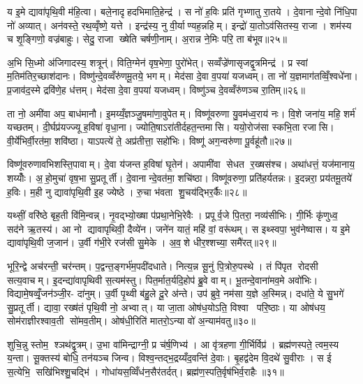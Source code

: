 य इ॒मे द्यावा॑पृथि॒वी म॑हि॒त्वा। बले॒नादृहदभिमाति॒हेन्द्र॑। स नो॑ ह॒विः प्रति॑ गृभ्णातु रा॒तये। दे॒वानान्दे॒वो नि॑धि॒पा नो॑ अव्यात्। अन॑वस्ते॒ रथ॒व्वृँष्णे॒ यत्ते। इन्द्र॑स्य॒ नु वी॒र्याण्यह॒न्नहिम्। इन्द्रो॑ या॒तोऽव॑सितस्य॒ राजा। शम॑स्य च शृ॒ङ्गिणो॒ वज्र॑बाहुः। सेदु॒ राजा ख्षेति चर्\mbox{}षणी॒नाम्। अ॒रान्न ने॒मिः परि॒ ता ब॑भूव॥२५॥

अ॒भि सि॒ध्मो अ॑जिगादस्य॒ शत्रून्॑। विति॒ग्मेन॑ वृष॒भेणा॒ पुरो॑भेत्। सव्वँज्रे॑णासृजद्वृ॒त्रमिन्द्र॑। प्र स्वां म॒तिम॑तिर॒च्छाश॑दानः। विष्णु॑न्दे॒वव्वँरु॑णमू॒तये॒ भगम्। मेद॑सा दे॒वा व॒पया॑ यजध्वम्। ता नो॑ य॒ज्ञमाग॑तव्विँ॒श्वधे॑ना। प्र॒जाव॑द॒स्मे द्रवि॑णे॒ह ध॑त्तम्। मेद॑सा दे॒वा व॒पया॑ यजध्वम्। विष्णु॑ञ्च दे॒वव्वँरु॑णञ्च रा॒तिम्॥२६॥

ता नो॒ अमी॑वा अप॒ बाध॑मानौ। इ॒मय्यँ॒ज्ञञ्जु॒षमा॑णा॒वुपेतम्। विष्णू॑वरुणा यु॒वम॑ध्व॒राय॑ नः। वि॒शे जना॑य॒ महि॒ शर्म॑ यच्छतम्। दी॒र्घप्र॑यज्ज्यू ह॒विषा॑ वृधा॒ना। ज्योति॒षाऽरा॑तीर्दहत॒न्तमासि। ययो॒रोज॑सा स्कभि॒ता रजासि। वी॒र्ये॑भिर्वी॒रत॑मा॒ शवि॑ष्ठा। याऽपत्ये॑ ते॒ अप्र॑तीत्ता॒ सहो॑भिः। विष्णू॑ अग॒न्वरु॑णा पू॒र्वहू॑तौ॥२७॥

विष्णू॑वरुणावभिशस्ति॒पावाम्। दे॒वा य॑जन्त ह॒विषा॑ घृ॒तेन॑। अपामी॑वा सेधत र॒ख्षस॑श्च। अथा॑धत्तं॒ यज॑मानाय॒ शय्योँः। अ॒हो॒मुचा॑ वृष॒भा सु॒प्रतूर्ती। दे॒वानान्दे॒वत॑मा॒ शचि॑ष्ठा। विष्णू॑वरुणा॒ प्रति॑हर्यतन्नः। इ॒दन्नरा॒ प्रय॑तमू॒तये॑ ह॒विः। म॒ही नु द्यावा॑पृथि॒वी इ॒ह ज्येष्ठे। रु॒चा भ॑वता शु॒चय॑द्भिर॒र्कैः॥२८॥

यथ्सीं॒ वरि॑ष्ठे बृह॒ती वि॑मि॒न्वन्न्। नृ॒वद्भ्यो॒ख्षा प॑प्रथा॒नेभि॒रेवैः। प्रपूर्व॒जे पि॒तरा॒ नव्य॑सीभिः। गी॒र्भिः कृ॑णुध्व॒ सद॑ने ऋ॒तस्य॑। आ नो द्यावापृथिवी॒ दैव्ये॑न। जने॑न यातं॒ महि॑ वां॒ वरू॑थम्। स इथ्स्वपा॒ भुव॑नेष्वास। य इ॒मे द्यावा॑पृथि॒वी ज॒जान॑। उ॒र्वी ग॑भी॒रे रज॑सी सु॒मेके। अ॒व॒शे धीर॒श्शच्या॒ समै॑रत्॥२९॥

भूरि॒न्द्वे अच॑रन्ती॒ चर॑न्तम्। प॒द्वन्त॒ङ्गर्भ॑म॒पदी॑दधाते। नित्य॒न्न सू॒नुं पि॒त्रोरु॒पस्थे। तं पि॑पृत रोदसी सत्य॒वाचम्। इ॒दन्द्या॑वापृथिवी स॒त्यम॑स्तु। पित॒र्मात॒र्यदि॒होप॑ ब्रु॒वे वाम्। भू॒तन्दे॒वाना॑मव॒मे अवो॑भिः। विद्यामे॒षव्वृँ॒जन॑ञ्जी॒र- दा॑नुम्। उ॒र्वी पृ॒थ्वी ब॑हु॒ले दू॒रे अ॑न्ते। उप॑ ब्रुवे॒ नम॑सा य॒ज्ञे अ॒स्मिन्न्। दधा॑ते॒ ये सु॒भगे॑ सु॒प्रतूर्ती। द्यावा॒ रख्ष॑तं पृथि॒वी नो॒ अभ्वात्। या जा॒ता ओष॑ध॒योऽति॒ विश्वा परि॒ष्ठाः। या ओष॑धय॒ सोम॑राज्ञीरश्वाव॒ती सो॑मव॒तीम्। ओष॑धी॒रिति॑ मातरो॒ऽन्या वो॑ अ॒न्याम॑वतु॥३०॥\anuvakamend[ह॒विर्नो॑ दाद्भभूव रा॒तिं पू॒र्वहू॑ताव॒र्कैरै॑रद॒स्मिन्पञ्च॑ च]

शुचि॒न्नु स्तोम॒ श्ञथ॑द्वृ॒त्रम्। उ॒भा वा॑मिन्द्राग्नी॒ प्र च॑र्\mbox{}ष॒णिभ्य॑। आ वृ॑त्रहणा गी॒र्भिर्विप्र॑। ब्रह्म॑णस्पते॒ त्वम॒स्य य॒न्ता। सू॒क्तस्य॑ बोधि॒ तन॑यञ्च जिन्व। विश्व॒न्तद्भ॒द्रय्यँद॒वन्ति॑ दे॒वाः। बृ॒हद्व॑देम वि॒दथे॑ सु॒वीराः। स ई स॒त्येभि॒ सखि॑भिश्शु॒चद्भि॑। गोधा॑यस॒व्विँध॑न॒सैर॑तर्दत्। ब्रह्म॑ण॒स्पति॒र्वृष॑भिर्व॒राहैः॥३१॥

